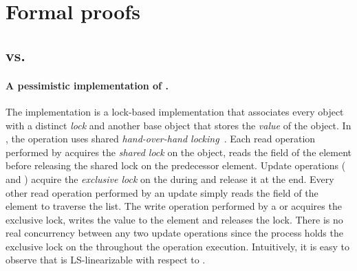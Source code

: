 \documentclass[11pt,pdftex,letterpaper]{article}
\begin{document}
\section{Formal proofs}
\label{app:proofs}
\subsection{ vs. }
\label{app:smp}
\paragraph{A pessimistic implementation  of .}
The implementation  is a lock-based implementation that associates every object with a 
distinct \emph{lock} and another base object that stores the \emph{value} of the object.
In , the  operation uses shared \emph{hand-over-hand 
locking}~\cite{BS88,HS08-book}.
Each read operation performed by  
acquires the \emph{shared lock} on the object, 
reads the  field of the element before releasing the shared lock on the predecessor element. 
Update operations ( and
) acquire the \emph{exclusive lock} on the  during  
and release it at the end. Every other read operation performed 
by an update simply reads the  field of the element to traverse the list. The write operation
performed by a  or  acquires the exclusive lock, writes the value
to the element and releases the lock.
There is no real concurrency between any two update operations since the process holds the 
exclusive lock on the  throughout the operation execution.
Intuitively, it is easy to observe that  is LS-linearizable with respect to .
\end{document}
